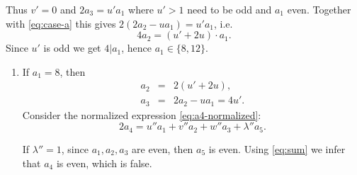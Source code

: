 \documentclass[12pt]{amsart}
\begin{document}
			Thus $v'=0$ and $2 a_3= u' a_1$ where $u'>1$ need to be odd and $a_1$ even.
				Together with \eqref{eq:case-a} this gives $2(2a_2-u a_1)= u' a_1$, i.e. 
							$$
							4 a_2= (u'+2u) \cdot a_1.
							$$ 
							Since $u'$ is odd we get $4| a_1$, hence $a_1 \in \{ 8, 12 \}$.
						\begin{enumerate}[leftmargin=0.5cm,label*=\arabic*.]
						\item If \underline{$a_1=8$}, then 
										$$\begin{matrix}   a_2 &=& 2(u'+2u),\\ a_3 &=& 2 a_2- u a_1= 4u' . \end{matrix}$$
										Consider the normalized expression \eqref{eq:a4-normalized}: 
											$$
											2a_4= u'' a_1 + v'' a_2 + w'' a_3 +\lambda'' a_5.
											$$ 
											
										  If $\lambda''=1$, since $a_1, a_2, a_3$ are even, then $a_5$ is even. Using \eqref{eq:sum} we infer that $a_4$ is even, which is false. 
											

\end{enumerate}
\end{document}
